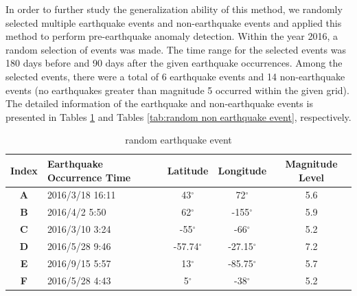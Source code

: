 \documentclass[3p,authoryear,preprint,12pt]{elsarticle}
\begin{document}
{In order to further study the generalization ability of this method, we randomly selected multiple earthquake events and non-earthquake events and applied this method to perform pre-earthquake anomaly detection.} {Within the year 2016, a random selection of events was made.} The time range for the selected events was 180 days before and 90 days after the given earthquake occurrences. Among the selected events, there were a total of 6 earthquake events and 14 non-earthquake events (no earthquakes greater than magnitude 5 occurred within the given grid). The detailed information of the earthquake and non-earthquake events is presented in Tables \ref{tab:random earthquake event} and Tables \ref{tab:random non earthquake event}, respectively.
\begin{table}[htbp]
	\caption{random earthquake event}
	\label{tab:random earthquake event}
	\centering
	\begin{tabular}{clccc}
		\toprule
		\textbf{Index} & \textbf{Earthquake Occurrence Time} &\textbf{Latitude}&\textbf{Longitude}&\textbf{Magnitude Level} \\
		\midrule
		\textbf{A}&2016/3/18 16:11 & 43$^\circ$     & 72$^\circ$     & 5.6  \\
		\textbf{B}&2016/4/2 5:50   & 62$^\circ$     & -155$^\circ$   & 5.9  \\
		\textbf{C}&2016/3/10 3:24  & -55$^\circ$    & -66$^\circ$    & 5.2  \\
		\textbf{D}&2016/5/28 9:46  & -57.74$^\circ$ & -27.15$^\circ$ & 7.2 \\
		\textbf{E}&2016/9/15 5:57  & 13$^\circ$     & -85.75$^\circ$ & 5.7 \\
		\textbf{F}&2016/5/28 4:43  & 5$^\circ$      & -38$^\circ$    & 5.2 \\
		\bottomrule
	\end{tabular}
\end{table}
\end{document}
